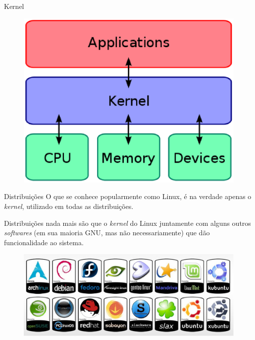 \documentclass[size=14pt,
style=paintings
]{powerdot}
\newenvironment{vslide}{\vspace{\stretch{1}}}{\vspace{\stretch{1}}}
\begin{document}
\begin{slide}{Kernel}


   \begin{figure}[!h]
  \includegraphics[scale=.8]{imagens/kernel1}
   \end{figure}

\end{slide}

\begin{slide}{Distribuições}
\begin{vslide}
O que se conhece popularmente como Linux, é na verdade apenas o \textit{kernel}, utilizado em todas as distribuições.

\vspace{0.5cm}
Distribuições nada mais são que o \textit{kernel} do Linux juntamente com alguns outros \textit{softwares} (em sua maioria GNU, mas não necessariamente) que dão funcionalidade ao sistema.

   \begin{figure}[!h]
  \includegraphics[scale=0.4]{imagens/distro}
   \end{figure}
\end{vslide}
\end{slide}
\end{document}
